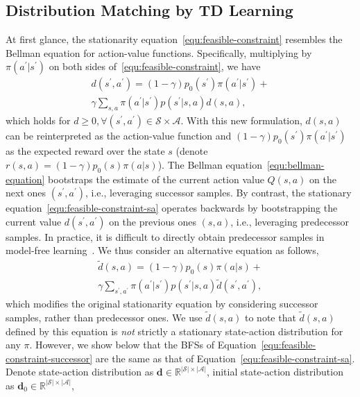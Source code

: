 \documentclass[letterpaper]{article} %
\newcommand{\m}[1]{\mathbf{#1}}
\begin{document}
\subsection{Distribution Matching by TD Learning}
At first glance, the stationarity equation~\eqref{equ:feasible-constraint} resembles the Bellman equation for action-value functions. 
Specifically, multiplying by $\pi(a^\prime|s^\prime)$ on both sides of~\eqref{equ:feasible-constraint}, we have
\begin{multline}\label{equ:feasible-constraint-sa}
d(s^\prime, a^\prime) = (1-\gamma) p_0(s^\prime)\pi(a^\prime|s^\prime) + \\
\gamma\sum_{s, a}\pi(a^\prime|s^\prime) p(s^\prime|s, a)d(s, a), 
\end{multline}
which holds for $d\geq 0, \forall (s^\prime, a^\prime)\in\mathcal{S}\times\mathcal{A}$. 
With this new formulation, $d(s, a)$ can be reinterpreted as the action-value function and $(1-\gamma)p_0(s^\prime)\pi(a^\prime|s^\prime)$ as the expected reward over the state $s$ (denote $r(s, a) = (1-\gamma)p_0(s)\pi(a|s)$). 
The Bellman equation~\eqref{equ:bellman-equation} bootstraps the estimate of the current action value $Q(s, a)$ on the next ones $(s^\prime , a^\prime)$, 
i.e., leveraging successor samples.  By contrast, the stationary equation~\eqref{equ:feasible-constraint-sa} operates backwards by bootstrapping the current value $d(s^\prime, a^\prime)$ on the previous ones $(s, a)$, 
i.e., leveraging predecessor samples. 
In practice, it is difficult to directly obtain predecessor samples in model-free learning~\cite{liu2018breaking}. 
We thus consider an alternative equation as follows, 
\begin{multline}\label{equ:feasible-constraint-successor}
\tilde{d}(s, a) = (1-\gamma) p_0(s)\pi(a|s) + \\
\gamma\sum_{s^\prime, a^\prime}\pi(a^\prime|s^\prime) p(s^\prime|s, a) \tilde{d}(s^\prime, a^\prime), 
\end{multline}
which modifies the original stationarity equation by considering successor samples, rather than predecessor ones.
We use $\tilde{d}(s, a)$ to note that $\tilde{d}(s, a)$ defined by this equation is \emph{not} strictly a stationary state-action distribution for any $\pi$. 
However, we show below that the BFSs of Equation~\eqref{equ:feasible-constraint-successor} are the same as that of Equation~\eqref{equ:feasible-constraint-sa}. 
Denote state-action distribution as $\m{d} \in\mathbb{R}^{|\mathcal{S}|\times|\mathcal{A}|}$, 
initial state-action distribution as $\m{d}_0 \in\mathbb{R}^{|\mathcal{S}|\times|\mathcal{A}|}$, 
\end{document}
